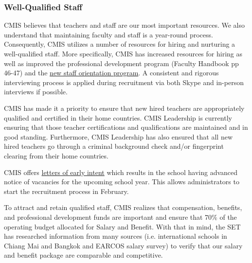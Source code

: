 \subsubsection{Well-Qualified Staff}



\begin{findings}
CMIS believes that teachers and staff are our most important resources. We also understand that maintaining faculty and staff is a year-round process. Consequently, CMIS utilizes a number of resources for hiring and nurturing a well-qualified staff. More specifically, CMIS has increased resources for hiring as well as improved the professional development program (Faculty Handbook pp 46-47) and the \href{https://docs.google.com/document/d/1dN2nFzb_NHUekvrnmY0A3ttMZoVuJKn4iRhvfT4j6go/edit}{new staff orientation program}. A consistent and rigorous interviewing process is applied during recruitment via both Skype and in-person interviews if possible.  

CMIS has made it a priority to ensure that new hired teachers are appropriately qualified and certified in their home countries. CMIS Leadership is currently ensuring that those teacher certifications and qualifications are maintained and in good standing. Furthermore, CMIS Leadership has also ensured that all new hired teachers go through a criminal background check and/or fingerprint clearing from their home countries. 
 
CMIS offers \href{https://docs.google.com/a/cmis.ac.th/forms/d/1zUFhXdeDp45qEERn_zrdiv0whW8qaKVmAy51M27IGu4/edit}{letters of early intent} which results in the school having advanced notice of vacancies for the upcoming school year. This allows administrators to start the recruitment process in February. 


To attract and retain qualified staff, CMIS realizes that compensation, benefits, and professional development funds are important and ensure that 70\% of the operating budget allocated for Salary and Benefit. With that in mind, the SET has researched information from many sources (i.e. international schools in Chiang Mai and Bangkok and EARCOS salary survey) to verify that our salary and benefit package are comparable and competitive. 


\end{findings}
